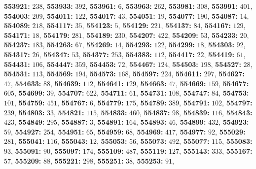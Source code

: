 \textsf{\bfseries 553921:} $238$, \textsf{\bfseries 553933:} $392$, \textsf{\bfseries 553961:} $6$, \textsf{\bfseries 553963:} $262$, \textsf{\bfseries 553981:} $308$, \textsf{\bfseries 553991:} $401$, \textsf{\bfseries 554003:} $209$, \textsf{\bfseries 554011:} $122$, \textsf{\bfseries 554017:} $43$, \textsf{\bfseries 554051:} $19$, \textsf{\bfseries 554077:} $190$, \textsf{\bfseries 554087:} $14$, \textsf{\bfseries 554089:} $218$, \textsf{\bfseries 554117:} $35$, \textsf{\bfseries 554123:} $5$, \textsf{\bfseries 554129:} $221$, \textsf{\bfseries 554137:} $84$, \textsf{\bfseries 554167:} $129$, \textsf{\bfseries 554171:} $18$, \textsf{\bfseries 554179:} $281$, \textsf{\bfseries 554189:} $230$, \textsf{\bfseries 554207:} $422$, \textsf{\bfseries 554209:} $53$, \textsf{\bfseries 554233:} $20$, \textsf{\bfseries 554237:} $183$, \textsf{\bfseries 554263:} $67$, \textsf{\bfseries 554269:} $14$, \textsf{\bfseries 554293:} $122$, \textsf{\bfseries 554299:} $18$, \textsf{\bfseries 554303:} $92$, \textsf{\bfseries 554317:} $26$, \textsf{\bfseries 554347:} $53$, \textsf{\bfseries 554377:} $253$, \textsf{\bfseries 554383:} $112$, \textsf{\bfseries 554417:} $22$, \textsf{\bfseries 554419:} $61$, \textsf{\bfseries 554431:} $106$, \textsf{\bfseries 554447:} $359$, \textsf{\bfseries 554453:} $72$, \textsf{\bfseries 554467:} $124$, \textsf{\bfseries 554503:} $198$, \textsf{\bfseries 554527:} $28$, \textsf{\bfseries 554531:} $113$, \textsf{\bfseries 554569:} $194$, \textsf{\bfseries 554573:} $168$, \textsf{\bfseries 554597:} $224$, \textsf{\bfseries 554611:} $297$, \textsf{\bfseries 554627:} $47$, \textsf{\bfseries 554633:} $88$, \textsf{\bfseries 554639:} $112$, \textsf{\bfseries 554641:} $129$, \textsf{\bfseries 554663:} $47$, \textsf{\bfseries 554669:} $159$, \textsf{\bfseries 554677:} $605$, \textsf{\bfseries 554699:} $39$, \textsf{\bfseries 554707:} $622$, \textsf{\bfseries 554711:} $61$, \textsf{\bfseries 554731:} $108$, \textsf{\bfseries 554747:} $84$, \textsf{\bfseries 554753:} $101$, \textsf{\bfseries 554759:} $451$, \textsf{\bfseries 554767:} $6$, \textsf{\bfseries 554779:} $175$, \textsf{\bfseries 554789:} $389$, \textsf{\bfseries 554791:} $102$, \textsf{\bfseries 554797:} $239$, \textsf{\bfseries 554803:} $33$, \textsf{\bfseries 554821:} $115$, \textsf{\bfseries 554833:} $460$, \textsf{\bfseries 554837:} $98$, \textsf{\bfseries 554839:} $116$, \textsf{\bfseries 554843:} $423$, \textsf{\bfseries 554849:} $295$, \textsf{\bfseries 554887:} $3$, \textsf{\bfseries 554891:} $164$, \textsf{\bfseries 554893:} $46$, \textsf{\bfseries 554899:} $432$, \textsf{\bfseries 554923:} $59$, \textsf{\bfseries 554927:} $254$, \textsf{\bfseries 554951:} $65$, \textsf{\bfseries 554959:} $68$, \textsf{\bfseries 554969:} $417$, \textsf{\bfseries 554977:} $92$, \textsf{\bfseries 555029:} $281$, \textsf{\bfseries 555041:} $116$, \textsf{\bfseries 555043:} $12$, \textsf{\bfseries 555053:} $56$, \textsf{\bfseries 555073:} $492$, \textsf{\bfseries 555077:} $115$, \textsf{\bfseries 555083:} $93$, \textsf{\bfseries 555091:} $90$, \textsf{\bfseries 555097:} $174$, \textsf{\bfseries 555109:} $487$, \textsf{\bfseries 555119:} $127$, \textsf{\bfseries 555143:} $333$, \textsf{\bfseries 555167:} $57$, \textsf{\bfseries 555209:} $88$, \textsf{\bfseries 555221:} $298$, \textsf{\bfseries 555251:} $38$, \textsf{\bfseries 555253:} $91$, 
